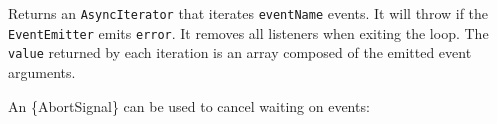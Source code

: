 \begin{Shaded}
\begin{Highlighting}[]
\OperatorTok{,} \NormalTok{ \} }\OperatorTok{=} \NormalTok{(}\NormalTok{)}\OperatorTok{;}

\NormalTok{(}\NormalTok{ () }\KeywordTok{=\textgreater{}}\NormalTok{ \{}
  \OperatorTok{=}  \NormalTok{()}\OperatorTok{;}

  \NormalTok{(() }\KeywordTok{=\textgreater{}}\NormalTok{ \{}
\NormalTok{(}\OperatorTok{,} \NormalTok{)}\OperatorTok{;}
\NormalTok{(}\OperatorTok{,} \NormalTok{)}\OperatorTok{;}
\NormalTok{  \})}\OperatorTok{;}

   \NormalTok{ (}   \OperatorTok{,} \NormalTok{)) \{}
    \NormalTok{(}\NormalTok{)}\OperatorTok{;} 
\NormalTok{  \}}
\NormalTok{\})()}\OperatorTok{;}
\end{Highlighting}
\end{Shaded}

Returns an \texttt{AsyncIterator} that iterates \texttt{eventName}
events. It will throw if the \texttt{EventEmitter} emits
\texttt{\textquotesingle{}error\textquotesingle{}}. It removes all
listeners when exiting the loop. The \texttt{value} returned by each
iteration is an array composed of the emitted event arguments.

An \{AbortSignal\} can be used to cancel waiting on events:

